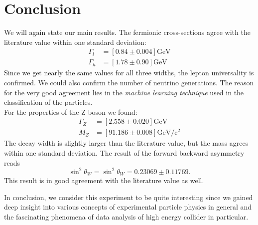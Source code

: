 \section{Conclusion}
We will again state our main results.
The fermionic cross-sections agree with the literature value within one standard deviation:
\begin{align*}
    \Gamma_l &=  \left[ 0.84 \pm 0.004 \right]\mathrm{GeV}\\ 
    \Gamma_h &=  \left[ 1.78 \pm 0.90 \right] \mathrm{GeV}
\end{align*}
Since we get nearly the same values for all three widths, the lepton universality is confirmed. We could also
confirm the number of neutrino generations.
The reason for the very good agreement lies in the \textit{machine learning technique} used in the classification
of the particles. \\
For the properties of the Z boson we found:
\begin{align*}
    \Gamma_Z  &= \left[ 2.558 \pm 0.020 \right] \mathrm{GeV}\\
    M_Z &= \left[ 91.186 \pm 0.008 \right] \mathrm{GeV / c^2} 
\end{align*}
The decay width is slightly larger than the literature value, but the mass agrees within one standard deviation.
The result of the forward backward asymmetry reads
\begin{equation*}
   \sin^2 \theta_W = \sin^2\theta_W = 0.23069 \pm 0.11769.
\end{equation*}
This result is in good agreement with the literature value as well.

In conclusion, we consider this experiment to be quite interesting since we gained deep 
insight into various concepts of experimental particle physics in general and the
fascinating phenomena of data analysis of high energy collider in particular.
